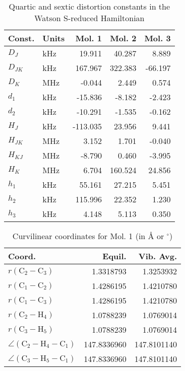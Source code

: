 \begin{table}
\centering
\caption{Quartic and sextic distortion constants in the Watson S-reduced Hamiltonian}
\begin{tabular}{llrrr}
Const.        & Units    &     Mol. 1 &     Mol. 2 &     Mol. 3 \\
\hline
$D_{J}$       & kHz      &     19.911 &     40.287 &      8.889 \\
$D_{JK}$      & kHz      &    167.967 &    322.383 &    -66.197 \\
$D_{K}$       & MHz      &     -0.044 &      2.449 &      0.574 \\
$d_{1}$       & kHz      &    -15.836 &     -8.182 &     -2.423 \\
$d_{2}$       & kHz      &    -10.291 &     -1.535 &     -0.162 \\
\hline
$H_{J}$       & kHz      &   -113.035 &     23.956 &      9.441 \\
$H_{JK}$      & MHz      &      3.152 &      1.701 &     -0.040 \\
$H_{KJ}$      & MHz      &     -8.790 &      0.460 &     -3.995 \\
$H_{K}$       & MHz      &      6.704 &    160.524 &     24.856 \\
$h_{1}$       & kHz      &     55.161 &     27.215 &      5.451 \\
$h_{2}$       & kHz      &    115.996 &     22.352 &      1.230 \\
$h_{3}$       & kHz      &      4.148 &      5.113 &      0.350 \\
\end{tabular}
\end{table}

\begin{table}
\centering
\caption{Curvilinear coordinates for Mol. 1 (in \AA{} or $^\circ$)}
\begin{tabular}{lrr}
       Coord.         &             Equil. &          Vib. Avg. \\
\hline
$r(\text{C}_{2} - \text{C}_{3})$ &          1.3318793 &          1.3253932 \\
$r(\text{C}_{1} - \text{C}_{2})$ &          1.4286195 &          1.4210780 \\
$r(\text{C}_{1} - \text{C}_{3})$ &          1.4286195 &          1.4210780 \\
$r(\text{C}_{2} - \text{H}_{4})$ &          1.0788239 &          1.0769014 \\
$r(\text{C}_{3} - \text{H}_{5})$ &          1.0788239 &          1.0769014 \\
$\angle(\text{C}_{2} - \text{H}_{4} - \text{C}_{1})$ &        147.8336960 &        147.8101140 \\
$\angle(\text{C}_{3} - \text{H}_{5} - \text{C}_{1})$ &        147.8336960 &        147.8101140 \\
\end{tabular}
\end{table}

